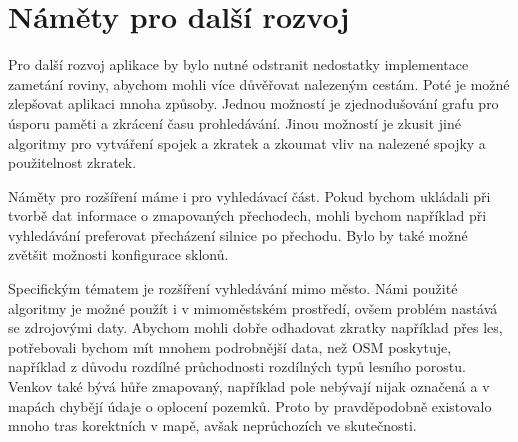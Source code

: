 \section{Náměty pro další rozvoj}
Pro další rozvoj aplikace by bylo nutné odstranit nedostatky implementace
zametání roviny, abychom mohli více důvěřovat nalezeným cestám. Poté je možné
zlepšovat aplikaci mnoha způsoby. Jednou možností je zjednodušování grafu pro
úsporu paměti a zkrácení času prohledávání. Jinou možností je zkusit jiné
algoritmy pro vytváření spojek a zkratek a zkoumat vliv na nalezené spojky a
použitelnost zkratek.

Náměty pro rozšíření máme i pro vyhledávací část. Pokud bychom ukládali při
tvorbě dat informace o zmapovaných přechodech, mohli bychom například při
vyhledávání preferovat přecházení silnice po přechodu. Bylo by také možné
zvětšit možnosti konfigurace sklonů. 

Specifickým tématem je rozšíření vyhledávání mimo město. Námi použité algoritmy
je možné použít i v mimoměstském prostředí, ovšem problém nastává se zdrojovými
daty. Abychom mohli dobře odhadovat zkratky například přes les, potřebovali
bychom mít mnohem podrobnější data, než OSM poskytuje, například z důvodu
rozdílné průchodnosti rozdílných typů lesního porostu. Venkov také bývá hůře
zmapovaný, například pole nebývají nijak označená a v mapách chybějí údaje o
oplocení pozemků. Proto by pravděpodobně existovalo mnoho tras korektních v
mapě, avšak neprůchozích ve skutečnosti.
